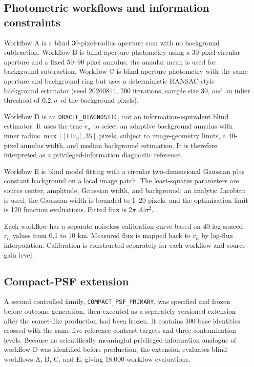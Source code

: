 \subsection{Photometric workflows and information
constraints}\label{photometric-workflows-and-information-constraints}

Workflow A is a blind 30-pixel-radius aperture sum with no background
subtraction. Workflow B is blind aperture photometry using a 30-pixel
circular aperture and a fixed 50--90 pixel annulus; the annular mean is
used for background subtraction. Workflow C is blind aperture photometry
with the same aperture and background ring but uses a deterministic
RANSAC-style background estimator (seed 20260814, 200 iterations, sample
size 30, and an inlier threshold of \(0.2\\,\sigma\) of the background
pixels).

Workflow D is an \texttt{ORACLE\_DIAGNOSTIC}, not an
information-equivalent blind estimator. It uses the true \(r_n\) to
select an adaptive background annulus with inner radius
\(\max[\lceil 11r_n\rceil,35]\) pixels, subject to image-geometry
limits, a 40-pixel annulus width, and median background estimation. It
is therefore interpreted as a privileged-information diagnostic
reference.

Workflow E is blind model fitting with a circular two-dimensional
Gaussian plus constant background on a local image patch. The
least-squares parameters are source center, amplitude, Gaussian width,
and background; an analytic Jacobian is used, the Gaussian width is
bounded to 1--20 pixels, and the optimization limit is 120 function
evaluations. Fitted flux is \(2\pi |A|\sigma^2\).

Each workflow has a separate noiseless calibration curve based on 40
log-spaced \(r_n\) values from 0.1 to 10 km. Measured flux is mapped
back to \(r_n\) by log-flux interpolation. Calibration is constructed
separately for each workflow and source-gain level.

\subsection{Compact-PSF extension}
\label{compact-psf-extension}

A second controlled family, \texttt{COMPACT\_PSF}\allowbreak\texttt{\_PRIMARY}, was
specified and frozen before outcome generation, then executed as a separately versioned extension after
the comet-like production had been frozen. It contains 300 base
identities crossed with the same five reference-contrast targets and
three contamination levels. Because no scientifically meaningful
privileged-information analogue of workflow D was identified before
production, the extension evaluates blind workflows A, B, C, and E,
giving 18,000 workflow evaluations.

